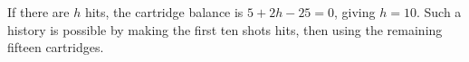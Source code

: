 If there are $h$ hits, the cartridge balance is $5+2h-25=0$, giving $\boxed{h=10}$. Such a history is possible by making the first ten shots hits, then using the remaining fifteen cartridges.
